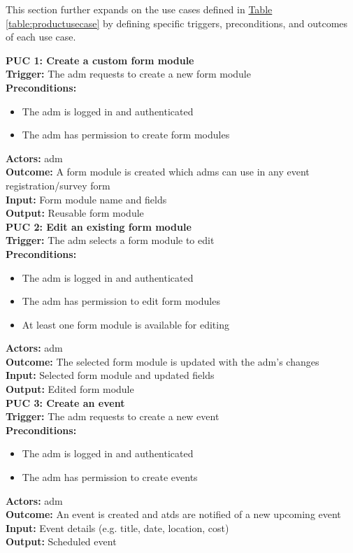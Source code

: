 \documentclass[12pt]{article}
\begin{document}
This section further expands on the use cases defined in \hyperref[table:productusecase]{Table \ref{table:productusecase}} by defining specific triggers, preconditions, and outcomes of each use case. \\

{\setlength{\parindent}{0pt}
\textbf{PUC 1: Create a custom form module} \\
\textbf{Trigger:} The \gls{adm} requests to create a new form module \\
\textbf{Preconditions:}
\begin{itemize}
  \item The \gls{adm} is logged in and authenticated
  \item The \gls{adm} has permission to create form modules
\end{itemize}
\textbf{Actors:} \Gls{adm} \\
\textbf{Outcome:} A form module is created which \glspl{adm} can use in any event registration/survey form \\
\textbf{Input:} Form module name and fields \\
\textbf{Output:} Reusable form module \\[1em]

\textbf{PUC 2: Edit an existing form module} \\
\textbf{Trigger:} The \gls{adm} selects a form module to edit \\
\textbf{Preconditions:}
\begin{itemize}
  \item The \gls{adm} is logged in and authenticated
  \item The \gls{adm} has permission to edit form modules
  \item At least one form module is available for editing
\end{itemize}
\textbf{Actors:} \Gls{adm} \\
\textbf{Outcome:} The selected form module is updated with the \gls{adm}’s changes \\
\textbf{Input:} Selected form module and updated fields \\
\textbf{Output:} Edited form module \\[1em]

\textbf{PUC 3: Create an event} \\
\textbf{Trigger:} The \gls{adm} requests to create a new event \\
\textbf{Preconditions:}
\begin{itemize}
  \item The \gls{adm} is logged in and authenticated
  \item The \gls{adm} has permission to create events
\end{itemize}
\textbf{Actors:} \Gls{adm} \\
\textbf{Outcome:} An event is created and \glspl{atd} are notified of a new upcoming event \\
\textbf{Input:} Event details (e.g. title, date, location, cost) \\
\textbf{Output:} Scheduled event \\[1em]

}
\end{document}
